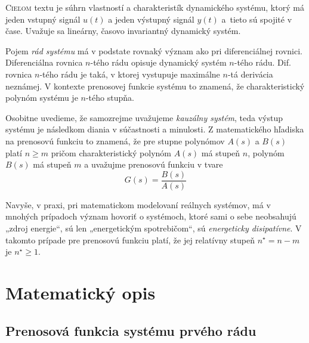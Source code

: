 \documentclass[a4paper, 10pt, ]{article}
\begin{document}
\bigskip

\normalsize
\normalfont












\noindent
\lettrine[lines=1, nindent=1pt, loversize=0.0]{C}{ieľom} 
textu je súhrn vlastností a charakteristík dynamického systému, ktorý má jeden vstupný signál $u(t)$ a jeden výstupný signál $y(t)$ a~tieto sú spojité v čase. Uvažuje sa lineárny, časovo invariantný dynamický systém.

Pojem \emph{rád systému} má v podstate rovnaký význam ako pri diferenciálnej rovnici. Diferenciálna rovnica $n$-tého rádu opisuje dynamický systém $n$-tého rádu. Dif. rovnica $n$-tého rádu je taká, v ktorej vystupuje maximálne $n$-tá derivácia neznámej. V kontexte prenosovej funkcie systému to znamená, že charakteristický polynóm systému je $n$-tého stupňa.

Osobitne uvedieme, že samozrejme uvažujeme \emph{kauzálny systém}, teda výstup systému je následkom diania v súčastnosti a minulosti. Z matematického hľadiska na prenosovú funkciu to znamená, že pre stupne polynómov $A(s)$ a $B(s)$ platí $n \geq m$ pričom charakteristický polynóm $A(s)$ má stupeň $n$, polynóm $B(s)$ má stupeň $m$ a uvažujme prenosovú funkciu v tvare
\begin{equation}
    G(s) = \frac{B(s)}{A(s)}
\end{equation}

Navyše, v praxi, pri matematickom modelovaní reálnych systémov, má v mnohých prípadoch význam hovoriť o systémoch, ktoré sami o sebe neobsahujú „zdroj energie“, sú len „energetickým spotrebičom“, sú \emph{energeticky disipatívne}. V takomto prípade pre prenosovú funkciu platí, že jej relatívny stupeň $n^\star = n-m$ je $n^\star \geq 1$.



\section{Matematický opis}


\subsection{Prenosová funkcia systému prvého rádu}
\end{document}
